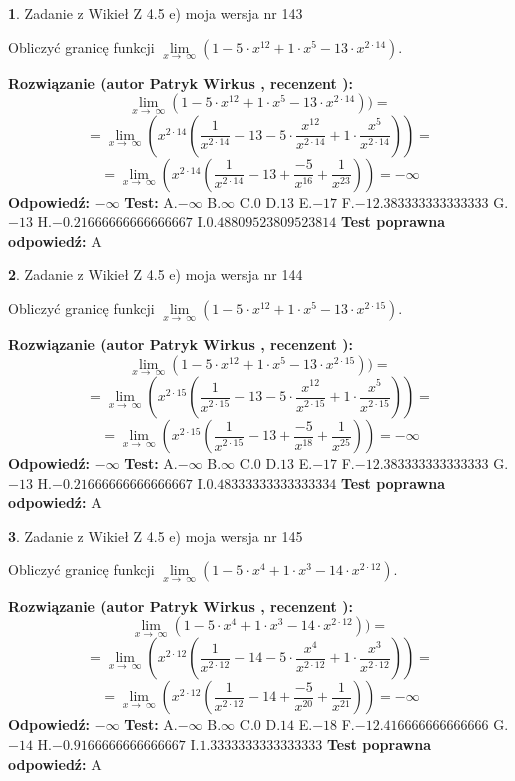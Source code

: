 \documentclass[12pt, a4paper]{article}
\theoremstyle{definition} %
\newtheorem{zad}{}
\newcommand{\zadStart}[1]{\begin{zad}#1\newline}
\newcommand{\zadStop}{\end{zad}}
\newcommand{\rozwStart}[2]{\noindent \textbf{Rozwiązanie (autor #1 , recenzent #2): }\newline}
\newcommand{\rozwStop}{\newline}
\newcommand{\odpStart}{\noindent \textbf{Odpowiedź:}\newline}
\newcommand{\odpStop}{\newline}
\newcommand{\testStart}{\noindent \textbf{Test:}\newline}
\newcommand{\testStop}{\newline}
\newcommand{\kluczStart}{\noindent \textbf{Test poprawna odpowiedź:}\newline}
\newcommand{\kluczStop}{\newline}
\begin{document}
\zadStart{Zadanie z Wikieł Z 4.5 e) moja wersja nr 143}


Obliczyć granicę funkcji  $\lim\limits_{x\to\ \infty}(1 - 5 \cdot x^{12}+1 \cdot x^{5}- 13 \cdot x^{2\cdot14})$.
\zadStop
\rozwStart{Patryk Wirkus}{}
$$\lim\limits_{x\to\ \infty}(1 - 5 \cdot x^{12}+1 \cdot x^{5}- 13 \cdot x^{2\cdot14}))=$$
$$=\lim\limits_{x\to\ \infty}(x^{2\cdot14}(\frac{1}{x^{2\cdot14}}-13 -5 \cdot \frac{x^{12}}{x^{2\cdot14}}+1 \cdot \frac{x^{5}}{x^{2\cdot14}}))=$$
$$=\lim\limits_{x\to\ \infty}(x^{2\cdot14}(\frac{1}{x^{2\cdot14}}-13 + \frac{-5}{x^{16}}+ \frac{1}{x^{23}}))=-\infty$$
\rozwStop
\odpStart
$-\infty$
\odpStop
\testStart
A.$-\infty$ B.$\infty$ C.$0$ D.$13$ E.$-17$
F.$-12.383333333333333$ G.$-13$
H.$-0.21666666666666667$
I.$0.48809523809523814$
\testStop
\kluczStart
A
\kluczStop



\zadStart{Zadanie z Wikieł Z 4.5 e) moja wersja nr 144}


Obliczyć granicę funkcji  $\lim\limits_{x\to\ \infty}(1 - 5 \cdot x^{12}+1 \cdot x^{5}- 13 \cdot x^{2\cdot15})$.
\zadStop
\rozwStart{Patryk Wirkus}{}
$$\lim\limits_{x\to\ \infty}(1 - 5 \cdot x^{12}+1 \cdot x^{5}- 13 \cdot x^{2\cdot15}))=$$
$$=\lim\limits_{x\to\ \infty}(x^{2\cdot15}(\frac{1}{x^{2\cdot15}}-13 -5 \cdot \frac{x^{12}}{x^{2\cdot15}}+1 \cdot \frac{x^{5}}{x^{2\cdot15}}))=$$
$$=\lim\limits_{x\to\ \infty}(x^{2\cdot15}(\frac{1}{x^{2\cdot15}}-13 + \frac{-5}{x^{18}}+ \frac{1}{x^{25}}))=-\infty$$
\rozwStop
\odpStart
$-\infty$
\odpStop
\testStart
A.$-\infty$ B.$\infty$ C.$0$ D.$13$ E.$-17$
F.$-12.383333333333333$ G.$-13$
H.$-0.21666666666666667$
I.$0.48333333333333334$
\testStop
\kluczStart
A
\kluczStop



\zadStart{Zadanie z Wikieł Z 4.5 e) moja wersja nr 145}


Obliczyć granicę funkcji  $\lim\limits_{x\to\ \infty}(1 - 5 \cdot x^{4}+1 \cdot x^{3}- 14 \cdot x^{2\cdot12})$.
\zadStop
\rozwStart{Patryk Wirkus}{}
$$\lim\limits_{x\to\ \infty}(1 - 5 \cdot x^{4}+1 \cdot x^{3}- 14 \cdot x^{2\cdot12}))=$$
$$=\lim\limits_{x\to\ \infty}(x^{2\cdot12}(\frac{1}{x^{2\cdot12}}-14 -5 \cdot \frac{x^{4}}{x^{2\cdot12}}+1 \cdot \frac{x^{3}}{x^{2\cdot12}}))=$$
$$=\lim\limits_{x\to\ \infty}(x^{2\cdot12}(\frac{1}{x^{2\cdot12}}-14 + \frac{-5}{x^{20}}+ \frac{1}{x^{21}}))=-\infty$$
\rozwStop
\odpStart
$-\infty$
\odpStop
\testStart
A.$-\infty$ B.$\infty$ C.$0$ D.$14$ E.$-18$
F.$-12.416666666666666$ G.$-14$
H.$-0.9166666666666667$
I.$1.3333333333333333$
\testStop
\kluczStart
A
\kluczStop
\end{document}
